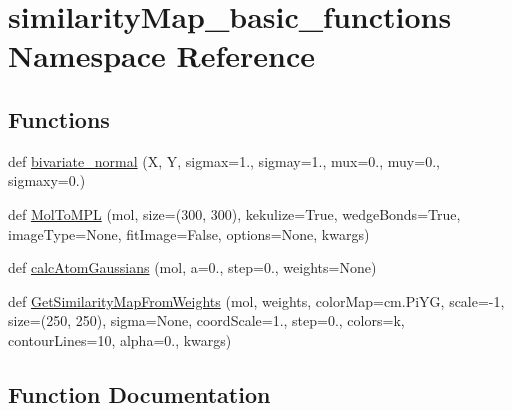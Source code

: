 \hypertarget{namespacesimilarity_map__basic__functions}{}\section{similarity\+Map\+\_\+basic\+\_\+functions Namespace Reference}
\label{namespacesimilarity_map__basic__functions}
\subsection*{Functions}
\begin{DoxyCompactItemize}
\item 
def \mbox{\hyperlink{namespacesimilarity_map__basic__functions_a2a2f48a34225878f6a6467f8688bafa7}{bivariate\+\_\+normal}} (X, Y, sigmax=1., sigmay=1., mux=0., muy=0., sigmaxy=0.)
\item 
def \mbox{\hyperlink{namespacesimilarity_map__basic__functions_a5ab36705860454e61699e49334092bfa}{Mol\+To\+M\+PL}} (mol, size=(300, 300), kekulize=True, wedge\+Bonds=True, image\+Type=None, fit\+Image=False, options=None, kwargs)
\item 
def \mbox{\hyperlink{namespacesimilarity_map__basic__functions_afc5323ea545c046f2e51add99b20b632}{calc\+Atom\+Gaussians}} (mol, a=0., step=0., weights=None)
\item 
def \mbox{\hyperlink{namespacesimilarity_map__basic__functions_aa41398ca7ff27913d4c3b497d892760c}{Get\+Similarity\+Map\+From\+Weights}} (mol, weights, color\+Map=cm.\+Pi\+YG, scale=-\/1, size=(250, 250), sigma=None, coord\+Scale=1., step=0., colors=\textquotesingle{}k\textquotesingle{}, contour\+Lines=10, alpha=0., kwargs)
\end{DoxyCompactItemize}


\subsection{Function Documentation}
\mbox{\label{namespacesimilarity_map__basic__functions_a2a2f48a34225878f6a6467f8688bafa7}} 
